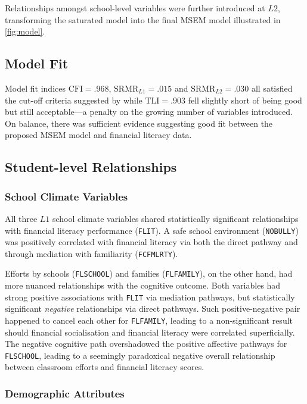 Relationships amongst school-level variables were further introduced at $L2$, transforming the saturated model into the final MSEM model illustrated in \cref{fig:model}.

\subsection{Model Fit}

Model fit indices $\text{CFI} = .968$, $\text{SRMR}_{L1} = .015$ and $\text{SRMR}_{L2} =.030$ all satisfied the cut-off criteria suggested by \textcite{hu:1999} while $\text{TLI} = .903$ fell slightly short of being good but still acceptable---a penalty on the growing number of variables introduced. On balance, there was sufficient evidence suggesting good fit between the proposed MSEM model and financial literacy data.

\subsection{Student-level Relationships}

\subsubsection{School Climate Variables}

All three $L1$ school climate variables shared statistically significant relationships with financial literacy performance (\texttt{FLIT}). A safe school environment (\texttt{NOBULLY}) was positively correlated with financial literacy via both the direct pathway and through mediation with familiarity (\texttt{FCFMLRTY}).

Efforts by schools (\texttt{FLSCHOOL}) and families (\texttt{FLFAMILY}), on the other hand, had more nuanced relationships with the cognitive outcome. Both variables had strong positive associations with \texttt{FLIT} via mediation pathways, but statistically significant \emph{negative} relationships via direct pathways. Such positive-negative pair happened to cancel each other for \texttt{FLFAMILY}, leading to a non-significant result should financial socialisation and financial literacy were correlated superficially. The negative cognitive path overshadowed the positive affective pathways for \texttt{FLSCHOOL}, leading to a seemingly paradoxical negative overall relationship between classroom efforts and financial literacy scores.

\subsubsection{Demographic Attributes}


